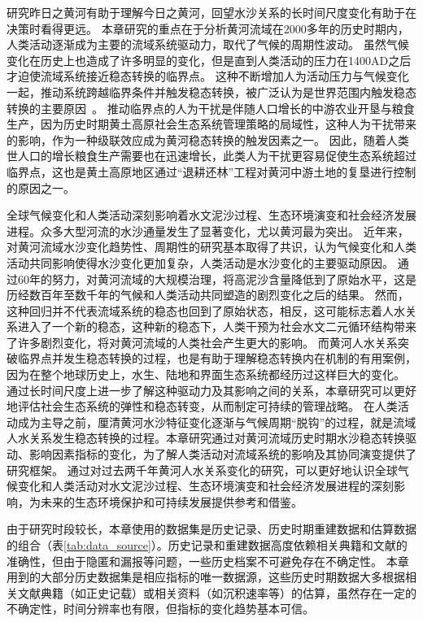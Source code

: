 研究昨日之黄河有助于理解今日之黄河，回望水沙关系的长时间尺度变化有助于在决策时看得更远。
本章研究的重点在于分析黄河流域在$2000$多年的历史时期内，人类活动逐渐成为主要的流域系统驱动力，取代了气候的周期性波动。
虽然气候变化在历史上也造成了许多明显的变化，但是直到人类活动的压力在1400AD之后才迫使流域系统接近稳态转换的临界点。
这种不断增加人为活动压力与气候变化一起，推动系统跨越临界条件并触发稳态转换，被广泛认为是世界范围内触发稳态转换的主要原因~\cite{scheffer2001,scheffer2003}。
推动临界点的人为干扰是伴随人口增长的中游农业开垦与粮食生产，因为历史时期黄土高原社会\textendash{}生态系统管理策略的局域性，这种人为干扰带来的影响，作为一种级联效应成为黄河稳态转换的触发因素之一\cite{rocha2018,wu2020a}。
因此，随着人类世人口的增长粮食生产需要也在迅速增长，此类人为干扰更容易促使生态系统超过临界点，这也是黄土高原地区通过“退耕还林”工程对黄河中游土地的复垦进行控制的原因之一。

全球气候变化和人类活动深刻影响着水文泥沙过程、生态环境演变和社会经济发展进程。众多大型河流的水沙通量发生了显著变化，尤以黄河最为突出\cite{best2019, best2020}。
近年来，对黄河流域水沙变化趋势性、周期性的研究基本取得了共识，认为气候变化和人类活动共同影响使得水沙变化更加复杂，人类活动是水沙变化的主要驱动原因\cite{wang2016a, ma2020}。
通过$60$年的努力，对黄河流域的大规模治理，将高泥沙含量降低到了原始水平，这是历经数百年至数千年的气候和人类活动共同塑造的剧烈变化之后的结果\cite{wang2016a, ji2018}。
然而，这种回归并不代表流域系统的稳态也回到了原始状态，相反，这可能标志着人\textendash{}水关系进入了一个新的稳态，这种新的稳态下，人类干预为社会\textendash{}水文二元循环结构带来了许多剧烈变化，将对黄河流域的人类社会产生更大的影响。
而黄河人\textendash{}水关系突破临界点并发生稳态转换的过程，也是有助于理解稳态转换内在机制的有用案例，因为在整个地球历史上，水生、陆地和界面生态系统都经历过这样巨大的变化\cite{hughes2013, rocha2018}。
通过长时间尺度上进一步了解这种驱动力及其影响之间的关系，本章研究可以更好地评估社会\textendash{}生态系统的弹性和稳态转变，从而制定可持续的管理战略\cite{scheffer2003}。
在人类活动成为主导之前，厘清黄河水沙特征变化逐渐与气候周期“脱钩”的过程，就是流域人\textendash{}水关系发生稳态转换的过程。本章研究通过对黄河流域历史时期水沙稳态转换驱动、影响因素指标的变化，为了解人类活动对流域系统的影响及其协同演变提供了研究框架。
通过对过去两千年黄河人\textendash{}水关系变化的研究，可以更好地认识全球气候变化和人类活动对水文泥沙过程、生态环境演变和社会经济发展进程的深刻影响，为未来的生态环境保护和可持续发展提供参考和借鉴。

由于研究时段较长，本章使用的数据集是历史记录、历史时期重建数据和估算数据的组合（表\ref{tab:data_source}）。历史记录和重建数据高度依赖相关典籍和文献的准确性，但由于隐匿和漏报等问题，一些历史档案不可避免存在不确定性\cite{wu2020a}。
本章用到的大部分历史数据集是相应指标的唯一数据源，这些历史时期数据大多根据相关文献典籍（如正史记载）或相关资料（如沉积速率等）的估算，虽然存在一定的不确定性，时间分辨率也有限，但指标的变化趋势基本可信。
